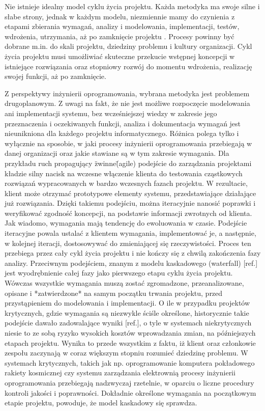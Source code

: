       Nie istnieje idealny model cyklu życia projektu. Każda metodyka ma swoje silne i słabe strony, jednak w każdym modelu, niezmiennie mamy do czynienia z etapami zbierania wymagań, analizy i modelowania, implementacji, testów, wdrożenia, utrzymania, aż po zamknięcie projektu \cite{Brooks87}. Procesy powinny być dobrane m.in. do skali projektu, dziedziny problemu i kultury organizacji. Cykl życia projektu musi umożliwiać skuteczne przekucie wstępnej koncepcji w istniejące rozwiązania oraz stopniowy rozwój do momentu wdrożenia, realizację swojej funkcji, aż po zamknięcie. 

      Z perspektywy inżynierii oprogramowania, wybrana metodyka jest problemem drugoplanowym. Z uwagi na fakt, że nie jest możliwe rozpoczęcie modelowania ani implementacji systemu, bez wcześniejszej wiedzy w zakresie jego przeznaczenia i oczekiwanych funkcji, analiza i dokumentacja wymagań jest nieunikniona dla każdego projektu informatycznego. Różnica polega tylko i wyłącznie na sposobie, w jaki procesy inżynierii oprogramowania przebiegają w danej organizacji oraz jakie stawiane są w tym zakresie wymagania. Dla przykładu ruch propagujący \"zwinne\" (agile) podejście do zarządzania projektami kładzie silny nacisk na wczesne włączenie klienta do testowania cząstkowych rozwiązań wypracowanych w bardzo wczesnych fazach projektu. W rezultacie, klient może otrzymać prototypowe elementy systemu, przedstawiające działające już rozwiązania. Dzięki takiemu podejściu, można iteracyjnie nanosić poprawki i weryfikować zgodność koncepcji, na podstawie informacji zwrotnych od klienta. Jak wiadomo, wymagania mają tendencję do ewoluowania w czasie. Podejście iteracyjne powala ustalać z klientem wymagania, implementować je, a następnie, w kolejnej iteracji, dostosowywać do zmieniającej się rzeczywistości. Proces ten przebiega przez cały cykl życia projektu i nie kończy się z chwilą zakończenia fazy analizy. Przeciwnym podejściem, znanym z modelu kaskadowego (waterfall) [ref.] jest wyodrębnienie całej fazy jako pierwszego etapu cyklu życia projektu. Wówczas wszystkie wymagania muszą zostać zgromadzone, przeanalizowane, opisane i *zatwierdzone* na samym początku trwania projektu, przed przystąpieniem do modelowania i implementacji. O ile w przypadku projektów krytycznych, gdzie wymagania są niezwykle ściśle określone, historycznie takie podejście dawało zadowalające wyniki [ref.], o tyle w systemach niekrytycznych niesie to ze sobą ryzyko wysokich kosztów wprowadzania zmian, na późniejszych etapach projektu. Wynika to przede wszystkim z faktu, iż klient oraz członkowie zespołu zaczynają w coraz większym stopniu rozumieć dziedzinę problemu. W systemach krytycznych, takich jak np. oprogramowanie komputera pokładowego rakiety kosmicznej czy systemu zarządzania elektrownią procesy inżynierii oprogramowania przebiegają nadzwyczaj rzetelnie, w oparciu o liczne procedury kontroli jakości i poprawności. Dokładnie określone wymagania na początkowym etapie projektu, powoduje, że model kaskadowy się sprawdza. \cite{NasaSE} 

